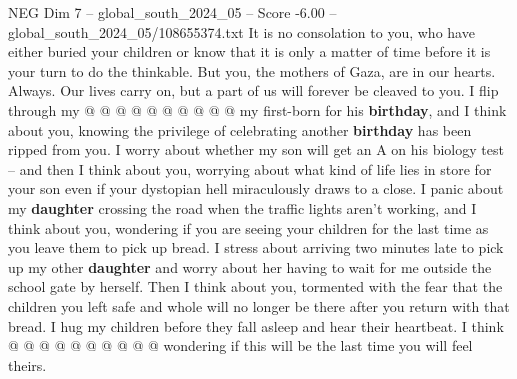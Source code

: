 \begin{textsample}{NEG Dim 7 – global\_south\_2024\_05 – Score -6.00 – global\_south\_2024\_05/108655374.txt}
It is no consolation to you, who have either buried your children or know that it is only a matter of time before it is your turn to do the thinkable.
But you, the mothers of Gaza, are in our hearts.
Always.
Our lives carry on, but a part of us will forever be cleaved to you.
I flip through my @ @ @ @ @ @ @ @ @ @ my first-born for his \textbf{birthday}, and I think about you, knowing the privilege of celebrating another \textbf{birthday} has been ripped from you.
I worry about whether my son will get an A on his biology test -- and then I think about you, worrying about what kind of life lies in store for your son even if your dystopian hell miraculously draws to a close.
I panic about my \textbf{daughter} crossing the road when the traffic lights aren't working, and I think about you, wondering if you are seeing your children for the last time as you leave them to pick up bread.
I stress about arriving two minutes late to pick up my other \textbf{daughter} and worry about her having to wait for me outside the school gate by herself.
Then I think about you, tormented with the fear that the children you left safe and whole will no longer be there after you return with that bread.
I hug my children before they fall asleep and hear their heartbeat.
I think @ @ @ @ @ @ @ @ @ @ wondering if this will be the last time you will feel theirs.

\end{textsample}
